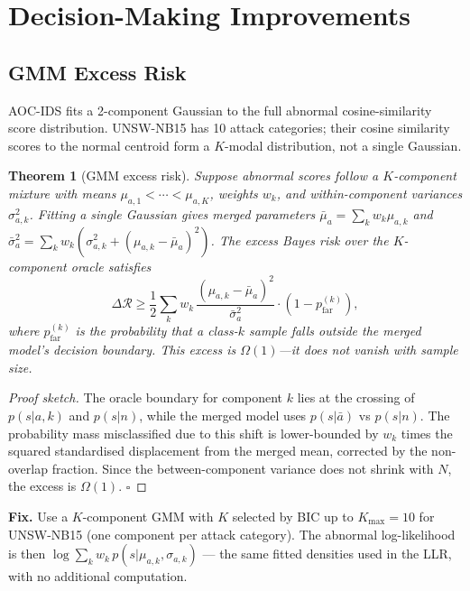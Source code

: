 \documentclass[conference]{IEEEtran}
\newtheorem{theorem}{Theorem}
\begin{document}
\section{Decision-Making Improvements}\label{sec:decision}

\subsection{GMM Excess Risk}

AOC-IDS fits a 2-component Gaussian to the full abnormal cosine-similarity
score distribution. UNSW-NB15 has 10 attack categories; their cosine
similarity scores to the normal centroid form a $K$-modal distribution,
not a single Gaussian.

\begin{theorem}[GMM excess risk]\label{thm:gmm-risk}
Suppose abnormal scores follow a $K$-component mixture with means
$\mu_{a,1} < \cdots < \mu_{a,K}$, weights $w_k$, and within-component
variances $\sigma_{a,k}^2$. Fitting a single Gaussian gives merged parameters
$\bar\mu_a = \sum_k w_k \mu_{a,k}$ and
$\bar\sigma_a^2 = \sum_k w_k(\sigma_{a,k}^2 + (\mu_{a,k}-\bar\mu_a)^2)$.
The excess Bayes risk over the $K$-component oracle satisfies
\begin{equation}
\Delta\mathcal{R} \ge \frac{1}{2}\sum_k w_k\,
\frac{(\mu_{a,k} - \bar\mu_a)^2}{\bar\sigma_a^2}
\cdot (1 - p_{\mathrm{far}}^{(k)}),
\label{eq:gmm-risk}
\end{equation}
where $p_{\mathrm{far}}^{(k)}$ is the probability that a class-$k$ sample
falls outside the merged model's decision boundary.
This excess is $\Omega(1)$---it does not vanish with sample size.
\end{theorem}

\begin{proof}[Proof sketch]
The oracle boundary for component $k$ lies at the crossing of
$p(s|a,k)$ and $p(s|n)$, while the merged model uses $p(s|\bar{a})$
vs $p(s|n)$. The probability mass misclassified due to this shift is
lower-bounded by $w_k$ times the squared standardised displacement from the
merged mean, corrected by the non-overlap fraction.
Since the between-component variance does not shrink with $N$, the excess
is $\Omega(1)$. $\square$
\end{proof}

\textbf{Fix.} Use a $K$-component GMM with $K$ selected by BIC up to
$K_{\max} = 10$ for UNSW-NB15 (one component per attack category).
The abnormal log-likelihood is then $\log \sum_k w_k\, p(s|\mu_{a,k}, \sigma_{a,k})$
--- the same fitted densities used in the LLR, with no additional computation.
\end{document}
